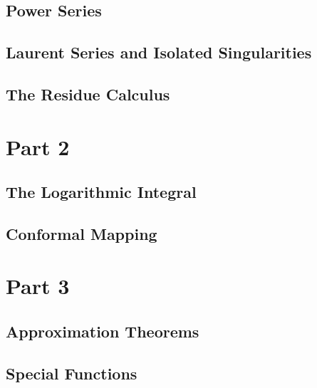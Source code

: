 \documentclass[12pt, a4paper, oneside, openright, titlepage]{book}
\begin{document}
\chapter{Power Series}




\chapter{Laurent Series and Isolated Singularities}



\chapter{The Residue Calculus}



\part{Part 2}

\chapter{The Logarithmic Integral}




\chapter{Conformal Mapping}





\part{Part 3}

\chapter{Approximation Theorems}




\chapter{Special Functions}








\begin{appendices}


\end{appendices}
\end{document}

